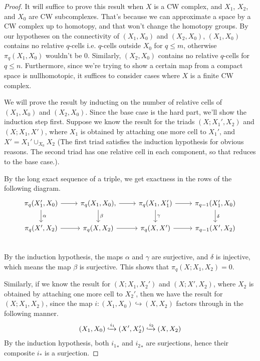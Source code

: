 \documentclass[12pt, notitlepage]{article}
\theoremstyle{definition}
\begin{document}
  \begin{proof}
    It will suffice to prove this result when $X$ is a CW complex, and $X_1$, $X_2$, and $X_0$ are
    CW subcomplexes.  That's because we can approximate a space by a CW complex up to homotopy, and
    that won't change the homotopy groups.  By our hypotheses on the connectivity of $(X_1, X_0)$
    and $(X_2, X_0)$, $(X_1, X_0)$ contains no relative $q$-cells i.e. $q$-cells outside $X_0$ for
    $q \leq m$, otherwise $\pi_q(X_1, X_0)$ wouldn't be $0$. Similarly, $(X_2, X_0)$ contains no
    relative $q$-cells for $q \leq n$. Furthermore, since we're trying to show a certain map from a
    compact space is nullhomotopic, it suffices to consider cases where $X$ is a finite CW complex.

    We will prove the result by inducting on the number of relative cells of $(X_1, X_0)$ and
    $(X_2, X_0)$. Since the base case is the hard part, we'll show the induction step first. Suppose
    we know the result for the triads $(X; X_1', X_2)$ and $(X; X_1, X')$, where $X_1$ is obtained
    by attaching one more cell to $X_1'$, and $X' = X_1' \cup_{X_0} X_2$ (The first triad satisfies
    the induction hypothesis for obvious reasons. The second triad has one relative cell in each
    component, so that reduces to the base case.).
     
    By the long exact sequence of a triple, we get exactness in the rows of the following diagram.
    \[
      \begin{tikzcd}
        \pi_q(X_1', X_0) \ar[d, "\alpha"] \ar[r] & \pi_q(X_1, X_0) \ar[d, "\beta"], \ar[r] &
        \pi_q(X_1, X_1') \ar[d, "\gamma"] \ar[r] & \pi_{q-1}(X_1', X_0) \ar[d, "\delta"] \\
        \pi_q(X', X_2) \ar[r] & \pi_q(X, X_2) \ar[r] & \pi_q(X, X') \ar[r] & \pi_{q-1}(X', X_2) \\
      \end{tikzcd}
    \]
    By the induction hypothesis, the maps $\alpha$ and $\gamma$ are surjective, and $\delta$ is
    injective, which means the map $\beta$ is surjective. This shows that $\pi_q(X; X_1, X_2) = 0$.

    Similarly, if we know the result for $(X; X_1, X_2')$ and $(X; X', X_2)$, where $X_2$ is
    obtained by attaching one more cell to $X_2'$, then we have the result for $(X; X_1, X_2)$,
    since the map $i: (X_1, X_0) \hookrightarrow (X, X_2)$ factors through in the following manner.
    \begin{align*}
      (X_1, X_0) \xhookrightarrow{i_1} (X', X_2') \xhookrightarrow{i_2} (X, X_2)
    \end{align*}
    By the induction hypothesis, both ${i_1}_{\ast}$ and ${i_2}_{\ast}$ are surjections, hence their
    composite $i_{\ast}$ is a surjection.


\end{proof}
\end{document}
